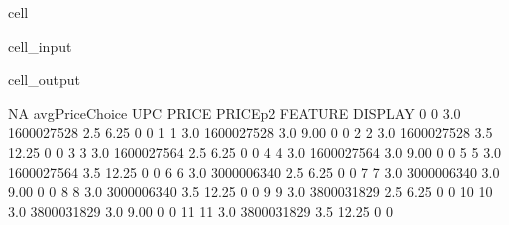 \documentclass[letterpaper,10pt,english]{jupyterBook}
\begin{document}
\begin{sphinxuseclass}{cell}\begin{sphinxVerbatimInput}

\begin{sphinxuseclass}{cell_input}
\begin{sphinxVerbatim}[commandchars=\\\{\}]
 

  


  

\end{sphinxVerbatim}

\end{sphinxuseclass}\end{sphinxVerbatimInput}
\begin{sphinxVerbatimOutput}

\begin{sphinxuseclass}{cell_output}
\begin{sphinxVerbatim}[commandchars=\\\{\}]
    NA  avgPriceChoice         UPC  PRICE  PRICE\PYGZus{}p2  FEATURE  DISPLAY  \PYGZbs{}
0    0             3.0  1600027528    2.5      6.25        0        0   
1    1             3.0  1600027528    3.0      9.00        0        0   
2    2             3.0  1600027528    3.5     12.25        0        0   
3    3             3.0  1600027564    2.5      6.25        0        0   
4    4             3.0  1600027564    3.0      9.00        0        0   
5    5             3.0  1600027564    3.5     12.25        0        0   
6    6             3.0  3000006340    2.5      6.25        0        0   
7    7             3.0  3000006340    3.0      9.00        0        0   
8    8             3.0  3000006340    3.5     12.25        0        0   
9    9             3.0  3800031829    2.5      6.25        0        0   
10  10             3.0  3800031829    3.0      9.00        0        0   
11  11             3.0  3800031829    3.5     12.25        0        0   


\end{sphinxVerbatim}
\end{sphinxuseclass}
\end{sphinxVerbatimOutput}
\end{sphinxuseclass}
\end{document}
